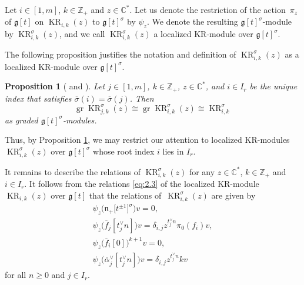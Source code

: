 \documentclass[pdftex]{sigma}
\numberwithin{equation}{section}
\newtheorem{Proposition}[Theorem]{Proposition}
 { \theoremstyle{definition}
\newtheorem{Definition}[Theorem]{Definition}
\newtheorem{Note}[Theorem]{Note}
\newtheorem{Example}[Theorem]{Example}
\newtheorem{Remark}[Theorem]{Remark} }
\DeclareMathOperator{\gr}{gr}
\DeclareMathOperator{\KR}{KR}
\begin{document}
\begin{Definition}\label{2.4}
Let $i\in [1,m]$, $k\in\mathbb{Z}_+$ and $z\in\mathbb{C}^*$. Let us denote the restriction of the action~$\pi_z$ of $\mathfrak{g}[t]$ on $\KR_{i,k}(z)$ to $\mathfrak{g}[t]^{\sigma}$ by $\psi_z$. We denote the resulting $\mathfrak{g}[t]^{\sigma}$-module by $\KR_{i,k}^{\sigma}(z)$, and we call $\KR_{i,k}^{\sigma}(z)$ a localized KR-module over $\mathfrak{g}[t]^{\sigma}$.
\end{Definition}

The following proposition justifies the notation and definition of $\KR_{i,k}^{\sigma}(z)$ as a localized KR-module over $\mathfrak{g}[t]^{\sigma}$.

\begin{Proposition}[{\cite[Theorem 4]{FL07} and \cite[Propositions 6.6, 6.7 and 7.2]{KV16}}]\label{2.5}
Let $j\in [1,m]$, $k\in\mathbb{Z}_+$, $z\in\mathbb{C}^*$, and $i\in I_r$ be the unique index that satisfies $\overline{\sigma}(i)=\overline{\sigma}(j)$. Then
\begin{equation*}
\gr\KR_{j,k}^{\sigma}(z)\cong \gr\KR_{i,k}^{\sigma}(z)\cong \KR_{i,k}^{\sigma}
\end{equation*}
as graded $\mathfrak{g}[t]^{\sigma}$-modules.
\end{Proposition}

Thus, by Proposition \ref{2.5}, we may restrict our attention to localized KR-modules $\KR_{i,k}^{\sigma}(z)$ over $\mathfrak{g}[t]^{\sigma}$ whose root index $i$ lies in $I_r$.

It remains to describe the relations of $\KR_{i,k}^{\sigma}(z)$ for any $z\in\mathbb{C}^*$, $k\in\mathbb{Z}_+$ and $i\in I_r$. It follows from the relations \eqref{eq:2.3} of the localized KR-module $\KR_{i,k}(z)$ over $\mathfrak{g}[t]$ that the relations of~$\KR_{i,k}^{\sigma}(z)$ are given by{\samepage
\begin{subequations}\label{eq:2.5}
\begin{gather}
\psi_z\bigl(\mathfrak{n}_+\bigl[t^{\pm1}\bigr]^{\sigma}\bigr)v =0,\\
\psi_z\bigl(\overline{f}_j[t_j^{\vee}n]\bigr)v =\delta_{i,j}z^{t_j^{\vee}n}\pi_0(f_i)v,\label{eq:2.5b}\\
\psi_z\bigl(\overline{f}_i[0]\bigr)^{k+1}v =0, \label{eq:2.5c}\\
\psi_z\bigl(\overline{\alpha}_j^{\vee}[t_j^{\vee}n]\bigr)v =\delta_{i,j}z^{t_j^{\vee}n}kv
\end{gather}
\end{subequations}
for all $n\geq0$ and $j\in I_r$.}
\end{document}
